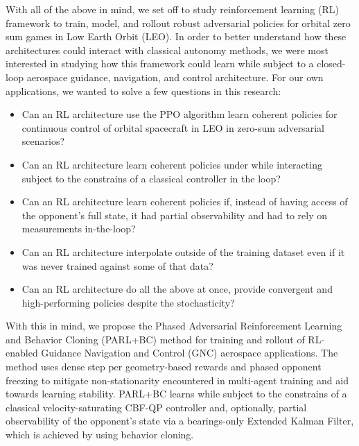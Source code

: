 With all of the above in mind, we set off to study reinforcement learning (RL) framework to train, model, and rollout robust adversarial policies for orbital zero sum games in Low Earth Orbit (LEO). In order to better understand how these architectures could interact with classical autonomy methods, we were most interested in studying how this framework could learn while subject to a closed-loop aerospace guidance, navigation, and control architecture. For our own applications, we wanted to solve a few questions in this research:

\begin{itemize}
    \item Can an RL architecture use the PPO algorithm learn coherent policies for continuous control of orbital spacecraft in LEO in zero-sum adversarial scenarios?
    \item Can an RL architecture learn coherent policies under while interacting subject to the constrains of a classical controller in the loop?
    \item Can an RL architecture learn coherent policies if, instead of having access of the opponent's full state, it had partial observability and had to rely on measurements in-the-loop?
    \item Can an RL architecture interpolate outside of the training dataset even if it was never trained against some of that data?
    \item Can an RL architecture do all the above at once, provide convergent and high-performing policies despite the stochasticity?
\end{itemize}


With this in mind, we propose the Phased Adversarial Reinforcement Learning and Behavior Cloning (PARL+BC) method for training and rollout of RL-enabled Guidance Navigation and Control (GNC) aerospace applications. The method uses dense step per geometry-based rewards and phased opponent freezing to mitigate non-stationarity encountered in multi-agent training and aid towards learning stability.  PARL+BC learns while subject to the constrains of a classical velocity-saturating CBF-QP controller and, optionally, partial observability of the opponent's state via a bearings-only Extended Kalman Filter, which is achieved by using behavior cloning.



